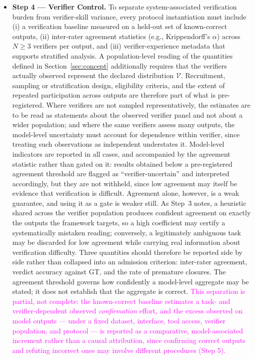 \documentclass[11pt]{article}
\newcommand{\rev}[1]{\textcolor{magenta}{#1}}
\newcommand{\viola}[1]{\textcolor[HTML]{7030A0}{#1}}
\newcommand{\rev}[1]{#1}
\newcommand{\viola}[1]{#1}
\begin{document}
\begin{itemize}
    \item \textbf{Step 4 --- Verifier Control.} {\viola{To separate system-associated verification burden from verifier-skill variance}, every protocol instantiation must include (i) a verification baseline measured on a held-out set of known-correct outputs, (ii) inter-rater agreement statistics (e.g., Krippendorff's $\alpha$) across $N \geq 3$ verifiers per output, and (iii) verifier-experience metadata that supports stratified analysis.
    \viola{A population-level reading of the quantities defined in Section~\ref{sec:concept} additionally requires that the verifiers actually observed represent the declared distribution $\mathcal{V}$. Recruitment, sampling or stratification design, eligibility criteria, and the extent of repeated participation across outputs are therefore part of what is pre-registered. Where verifiers are not sampled representatively, the estimates are to be read as statements about the observed verifier panel and not about a wider population; and where the same verifiers assess many outputs, the model-level uncertainty must account for dependence within verifier, since treating such observations as independent understates it.} \viola{Model-level indicators are reported in all cases, and accompanied by the agreement statistic rather than gated on it: results obtained below a pre-registered agreement threshold are flagged as ``verifier-uncertain'' and interpreted accordingly, but they are not withheld, since low agreement may itself be evidence that verification is difficult.}}
    \viola{Agreement alone, however, is a weak guarantee, and using it as a gate is weaker still. As Step~3 notes, a heuristic shared across the verifier population produces confident agreement on exactly the outputs the framework targets, so a high coefficient may certify a systematically mistaken reading; conversely, a legitimately ambiguous task may be discarded for low agreement while carrying real information about verification difficulty. Three quantities should therefore be reported side by side rather than collapsed into an admission criterion: inter-rater agreement, verdict accuracy against GT, and the rate of premature closures. The agreement threshold governs how confidently a model-level aggregate may be stated; it does not establish that the aggregate is correct.}
    \rev{This separation is partial, not complete: the known-correct baseline estimates a task- and verifier-dependent \viola{observed \emph{confirmation} effort}, and the excess observed on model outputs --- under a fixed dataset, interface, tool access, verifier population, and protocol --- is reported as a comparative, model-associated increment rather than a causal attribution, since confirming correct outputs and refuting incorrect ones may involve different procedures (Step 5).}


\end{itemize}
\end{document}
